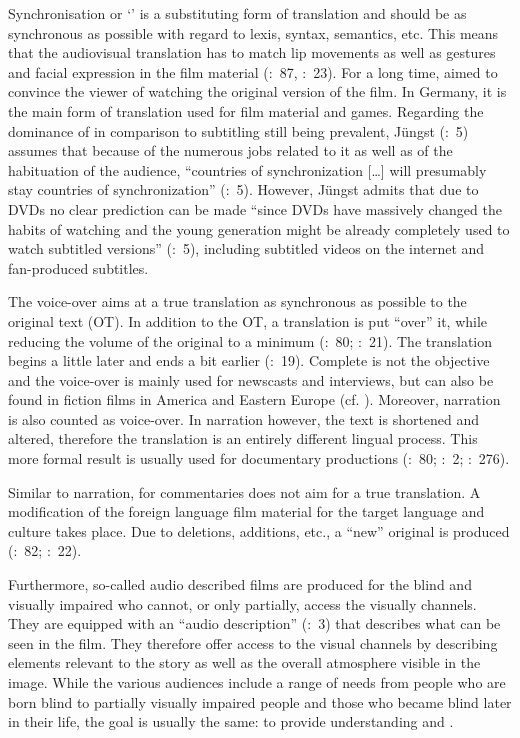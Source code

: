 Synchronisation or ‘’ is a substituting form of translation and should be as synchronous as possible with regard to lexis, syntax, semantics, etc. This means that the audiovisual translation has to match lip movements as well as gestures and facial expression in the film material (\citealt{Herbst1994}:~87, \citealt{Leisner2009}:~23). For a long time,  aimed to convince the viewer of watching the original version of the film. In Germany, it is the main form of translation used for film material and games. Regarding the dominance of  in comparison to subtitling still being prevalent, Jüngst (\citeyear{Jungst2010}:~5) assumes that because of the numerous jobs related to it as well as of the habituation of the audience, “countries of synchronization […] will presumably stay countries of synchronization” (\citeyear{Jungst2010}:~5). However, Jüngst admits that due to DVDs no clear prediction can be made “since DVDs have massively changed the habits of watching and the young generation might be already completely used to watch subtitled versions” (\citeyear{Jungst2010}:~5), including subtitled videos on the internet and fan-produced subtitles.

The voice-over aims at a true translation as synchronous as possible to the original text (OT). In addition to the OT, a translation is put “over” it, while reducing the volume of the original to a minimum (\citealt{Luyken1991}:~80; \citealt{Leisner2009}:~21). The translation begins a little later and ends a bit earlier (\citealt{Herbst1994}:~19). Complete  is not the objective and the voice-over is mainly used for newscasts and interviews, but can also be found in fiction films in America and Eastern Europe (cf. \citealt{szarkowska2009}). Moreover, narration is also counted as voice-over. In narration however, the text is shortened and altered, therefore the translation is an entirely different lingual process. This more formal result is usually used for documentary productions (\citealt{Luyken1991}:~80; \citealt{De_linde1999}:~2; \citealt{Gambier1994}:~276).

Similar to narration,  for commentaries does not aim for a true translation. A modification of the foreign language film material for the target language and culture takes place. Due to deletions, additions, etc., a “new” original is produced (\citealt{Luyken1991}:~82; \citealt{Leisner2009}:~22).

Furthermore, so-called audio described films are produced for the blind and visually impaired who cannot, or only partially, access the visually channels. They are equipped with an “audio description” (\citealt{Jungst2010}:~3) that describes what can be seen in the film. They therefore offer access to the visual channels by describing elements relevant to the story as well as the overall atmosphere visible in the image. While the various audiences include a range of needs from people who are born blind to partially visually impaired people and those who became blind later in their life, the goal is usually the same: to provide understanding and .

